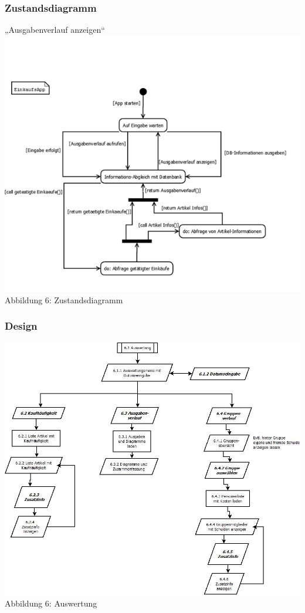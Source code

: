 \documentclass[12pt,a4paper]{article}
\begin{document}
\subsubsection*{Zustandsdiagramm}
 „Ausgabenverlauf anzeigen“
\\
\includegraphics[scale=0.9, origin=l]{Zustandsdiagramm.png}
\\
\footnotesize Abbildung 6: Zustandsdiagramm
\normalsize
\subsubsection*{Design}
\includegraphics[scale=0.5, origin=l]{060 Auswertungen.jpeg}
\\
\footnotesize Abbildung 6: Auswertung
\normalsize
\\
\end{document}
